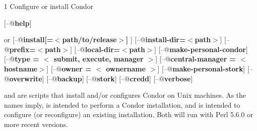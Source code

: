 \begin{ManPage}{\label{man-condor-configure}}{1}
{Configure or install Condor}

\Synopsis {}
[\verb@--@\textbf{help}]

 or 
[\verb@--@\textbf{install[=$<$path/to/release$>$] }]
[\verb@--@\textbf{install-dir=$<$path$>$}]
[\verb@--@\textbf{prefix=$<$path$>$}]
[\verb@--@\textbf{local-dir=$<$path$>$}]
[\verb@--@\textbf{make-personal-condor}]
[\verb@--@\textbf{type = $<$ submit, execute, manager $>$}]
[\verb@--@\textbf{central-manager = $<$ hostname$>$}]
[\verb@--@\textbf{owner = $<$ ownername $>$}]
[\verb@--@\textbf{make-personal-stork}]
[\verb@--@\textbf{overwrite}]
[\verb@--@\textbf{backup}]
[\verb@--@\textbf{stork}]
[\verb@--@\textbf{credd}]
[\verb@--@\textbf{verbose}]






\Description 

 and  are scripts that install
and/or configures Condor on Unix machines.  As the names imply,
 is intended to perform a Condor installation, and
 is intended to configure (or reconfigure) an
existing installation.
Both will run with Perl 5.6.0 or more recent versions.


\end{ManPage}
